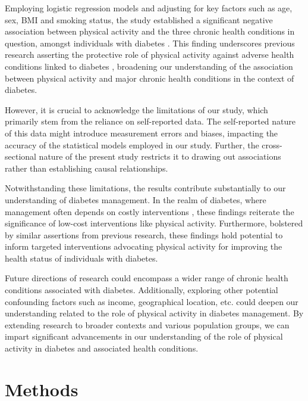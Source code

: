 \documentclass[11pt]{article}
\begin{document}
Employing logistic regression models and adjusting for key factors such as age, sex, BMI and smoking status, the study established a significant negative association between physical activity and the three chronic health conditions in question, amongst individuals with diabetes \cite{Heslin2021SexualOD}. This finding underscores previous research asserting the protective role of physical activity against adverse health conditions linked to diabetes \cite{Stein2015AssociationBP, Devaraj2020CardiovascularHI, Hamer2012LowDosePA}, broadening our understanding of the association between physical activity and major chronic health conditions in the context of diabetes.

However, it is crucial to acknowledge the limitations of our study, which primarily stem from the reliance on self-reported data. The self-reported nature of this data might introduce measurement errors and biases, impacting the accuracy of the statistical models employed in our study. Further, the cross-sectional nature of the present study restricts it to drawing out associations rather than establishing causal relationships. 

Notwithstanding these limitations, the results contribute substantially to our understanding of diabetes management. In the realm of diabetes, where management often depends on costly interventions \cite{Santhanakrishnan2014FactorsAC}, these findings reiterate the significance of low-cost interventions like physical activity. Furthermore, bolstered by similar assertions from previous research, these findings hold potential to inform targeted interventions advocating physical activity for improving the health status of individuals with diabetes.

Future directions of research could encompass a wider range of chronic health conditions associated with diabetes. Additionally, exploring other potential confounding factors such as income, geographical location, etc. could deepen our understanding related to the role of physical activity in diabetes management. By extending research to broader contexts and various population groups, we can impart significant advancements in our understanding of the role of physical activity in diabetes and associated health conditions.

\section*{Methods}
\end{document}
